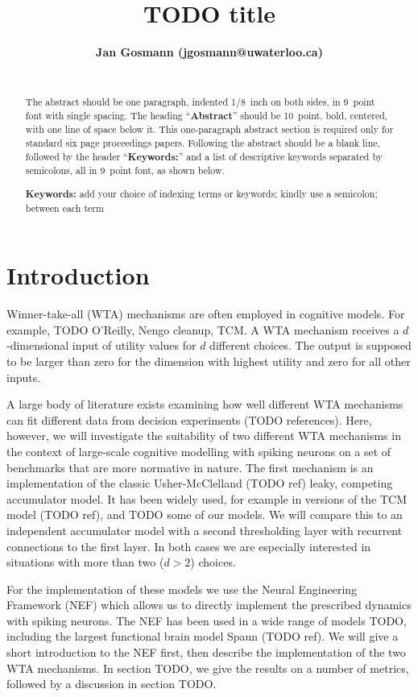 \documentclass[10pt,letterpaper]{article}
\title{TODO title}
\author{{\large \bf Jan Gosmann (jgosmann@uwaterloo.ca)} \\
  \AND{\large \bf Aaron Voelker (TODO)} \\
  \AND{\large \bf Chris Eliasmith (TODO)}
  }
\begin{document}
\maketitle


\begin{abstract}
The abstract should be one paragraph, indented 1/8~inch on both sides,
in 9~point font with single spacing. The heading ``{\bf Abstract}''
should be 10~point, bold, centered, with one line of space below
it. This one-paragraph abstract section is required only for standard
six page proceedings papers. Following the abstract should be a blank
line, followed by the header ``{\bf Keywords:}'' and a list of
descriptive keywords separated by semicolons, all in 9~point font, as
shown below.

\textbf{Keywords:} 
add your choice of indexing terms or keywords; kindly use a
semicolon; between each term
\end{abstract}


\section{Introduction}
Winner-take-all (WTA) mechanisms are often employed in cognitive models. For 
example, TODO O'Reilly, Nengo cleanup, TCM\@. A WTA mechanism receives 
a $d$-dimensional input of utility values for $d$ different choices. The output 
is supposed to be larger than zero for the dimension with highest utility and 
zero for all other inputs.

A large body of literature exists examining how well different WTA mechanisms 
can fit different data from decision experiments (TODO references). Here, 
however, we will investigate the suitability of two different WTA mechanisms in 
the context of large-scale cognitive modelling with spiking neurons on a set of 
benchmarks that are more normative in nature.  The first mechanism is an 
implementation of the classic Usher-McClelland (TODO ref) leaky, competing 
accumulator model.  It has been widely used, for example in versions of the TCM 
model (TODO ref), and TODO some of our models. We will compare this to an 
independent accumulator model with a second thresholding layer with recurrent 
connections to the first layer. In both cases we are especially interested in 
situations with more than two ($d > 2$) choices.

For the implementation of these models we use the Neural Engineering Framework 
(NEF) which allows us to directly implement the prescribed dynamics with spiking 
neurons. The NEF has been used in a wide range of models TODO, including the 
largest functional brain model Spaun (TODO ref). We will give a short 
introduction to the NEF first, then describe the implementation of the two WTA 
mechanisms. In section TODO, we give the results on a number of metrics, 
followed by a discussion in section TODO\@.
\end{document}

